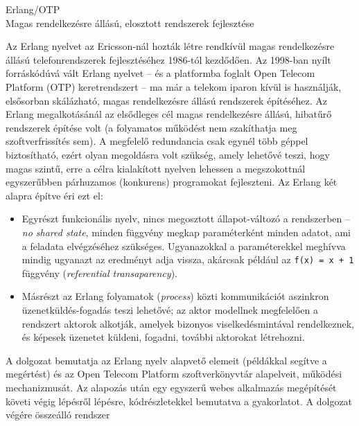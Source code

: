 \documentclass[12pt, a4paper, oneside]{book}
\begin{document}
\begin{center}
\Large{Erlang/OTP}\\
\vspace{0.3cm}
\large{Magas rendelkezésre állású, elosztott rendszerek
fejlesztése}
\vspace{1.5cm}
\end{center}

\onehalfspacing

Az Erlang nyelvet az Ericsson-nál hozták létre rendkívül magas rendelkezésre
állású telefonrendszerek fejlesztéséhez 1986-tól kezdődően. Az 1998-ban nyílt
forráskódúvá vált Erlang nyelvet -- és a platformba foglalt Open Telecom
Platform (OTP) keretrendszert -- ma már a telekom iparon kívül is használják,
elsősorban skálázható, magas rendelkezésre állású rendszerek építéséhez. Az
Erlang megalkotásánál az elsődleges cél magas rendelkezésre állású, hibatűrő
rendszerek építése volt (a folyamatos működést nem szakíthatja meg
szoftverfrissítés sem). A megfelelő redundancia csak egynél több géppel
biztosítható, ezért olyan megoldásra volt szükség, amely lehetővé teszi, hogy
magas szintű, erre a célra kialakított nyelven lehessen a megszokottnál
egyszerűbben párhuzamos (konkurens) programokat fejleszteni. Az Erlang két
alapra építve éri ezt el: 

\begin{itemize}
\item Egyrészt funkcionális nyelv, nincs megosztott állapot-változó a
rendszerben -- \emph{no shared state}, minden függvény megkap paraméterként
minden adatot, ami a feladata elvégzéséhez szükséges. Ugyanazokkal a
paraméterekkel meghívva mindig ugyanazt az eredményt adja vissza, akárcsak
például az \texttt{f(x) = x + 1} függvény (\emph{referential transaparency}).
\item Másrészt az Erlang folyamatok (\emph{process}) közti kommunikációt
aszinkron üzenetküldés-fogadás teszi lehetővé; az aktor modellnek megfelelően
a rendszert aktorok alkotják, amelyek bizonyos viselkedésmintával rendelkeznek,
és képesek üzenetet küldeni, fogadni, további aktorokat létrehozni.
\end{itemize}

A dolgozat bemutatja az Erlang nyelv alapvető elemeit (példákkal segítve a
megértést) és az Open Telecom Platform szoftverkönyvtár alapelveit, működési
mechanizmusát. Az alapozás után egy egyszerű webes alkalmazás megépítését
követi végig lépésről lépésre, kódrészletekkel bemutatva a gyakorlatot. A
dolgozat végére összeálló rendszer 
\end{document}
